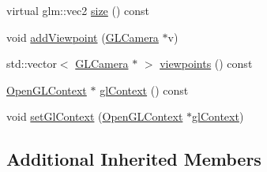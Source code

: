 \begin{DoxyCompactItemize}
\item 
virtual glm\-::vec2 \hyperlink{classmotorcar_1_1Display_aa8abb8de1affc4cc048f5ee7e82e8ab2}{size} () const 
\item 
void \hyperlink{classmotorcar_1_1Display_a2013ad3107c02d703aed234f32c42bfb}{add\-Viewpoint} (\hyperlink{classmotorcar_1_1GLCamera}{G\-L\-Camera} $\ast$v)
\item 
std\-::vector$<$ \hyperlink{classmotorcar_1_1GLCamera}{G\-L\-Camera} $\ast$ $>$ \hyperlink{classmotorcar_1_1Display_a5884e8dfd24a7cf2889291c52cc27a49}{viewpoints} () const 
\item 
\hyperlink{classmotorcar_1_1OpenGLContext}{Open\-G\-L\-Context} $\ast$ \hyperlink{classmotorcar_1_1Display_a884dd0b78dbecee82a33eb6d26a2a403}{gl\-Context} () const 
\item 
void \hyperlink{classmotorcar_1_1Display_a487018838d0ecfa96011a5ae5caa2e91}{set\-Gl\-Context} (\hyperlink{classmotorcar_1_1OpenGLContext}{Open\-G\-L\-Context} $\ast$\hyperlink{classmotorcar_1_1Display_a884dd0b78dbecee82a33eb6d26a2a403}{gl\-Context})
\end{DoxyCompactItemize}
\subsection*{Additional Inherited Members}


